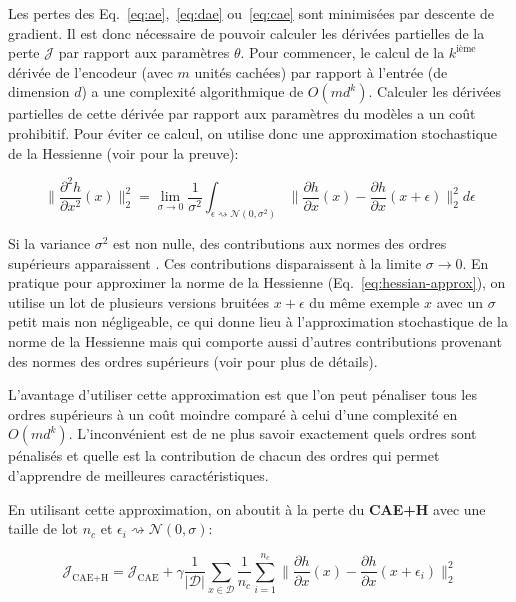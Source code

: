 Les pertes des Eq.~\ref{eq:ae},~\ref{eq:dae} ou~\ref{eq:cae} sont minimisées par
descente de gradient. Il est donc nécessaire de pouvoir calculer les dérivées
partielles de la perte $\mathcal{J}$ par rapport aux paramètres $\theta$. Pour commencer, le calcul de
la $k^{\textrm{ième}}$ dérivée de l'encodeur (avec $m$ unités cachées) par
rapport à l'entrée (de dimension $d$) a une complexité algorithmique de
$O(md^k)$.  Calculer les dérivées partielles de cette dérivée par rapport aux
paramètres du modèles a un coût prohibitif. Pour éviter ce calcul, on utilise donc
une approximation stochastique de la Hessienne (voir \cite{Salah+al-2011} pour
la preuve):

\begin{equation}
\|\dfrac{\partial^2 h}{\partial x^2}(x) \|_2^2 = \lim_{\sigma\rightarrow 0}\frac{1}{\sigma^2}\int_{\epsilon \rightsquigarrow \mathcal{N}(0,\sigma^2)} \| \dfrac{\partial h}{\partial x}(x) - \dfrac{\partial h}{\partial x}(x+\epsilon) \|^2_2 d\epsilon
\label{eq:hessian-approx}
\end{equation}

Si la variance $\sigma^{2}$ est non nulle, des contributions aux normes des ordres
supérieurs apparaissent \citep{Salah+al-2011}. Ces contributions disparaissent à
la limite $\sigma\rightarrow 0$. En pratique pour approximer la norme de la
Hessienne (Eq.~\ref{eq:hessian-approx}), on utilise un lot de plusieurs
versions bruitées $x+\epsilon$ du m\^eme exemple $x$ avec un $\sigma$ petit
mais non négligeable, ce qui donne lieu à l'approximation stochastique de la
norme de la Hessienne mais qui comporte aussi d'autres contributions provenant des
normes des ordres supérieurs (voir \cite{Salah+al-2011} pour plus de détails).

L'avantage d'utiliser cette approximation est que l'on peut pénaliser tous les
ordres supérieurs à un coût moindre comparé à celui d'une complexité en $O(md^k)$.
L'inconvénient est de ne plus savoir exactement quels ordres sont pénalisés et
quelle est la contribution de chacun des ordres qui permet d'apprendre de
meilleures caractéristiques. 

En utilisant cette approximation,  on aboutit à la perte du \textbf{CAE+H} avec
une taille de lot $n_c$ et $\epsilon_i \rightsquigarrow \mathcal{N}(0,\sigma)$:

\begin{equation}
\mathcal{J}_\textrm{CAE+H} = \mathcal{J}_\textrm{CAE} + \gamma\frac{1}{\vert \mathcal{D}\vert}\sum_{x\in\mathcal{D}} \frac{1}{n_c}\sum^{n_c}_{i=1} \| \dfrac{\partial h}{\partial x}(x) - \dfrac{\partial h}{\partial x}(x+\epsilon_i) \|^2_2 
\label{eq:cae}
\end{equation}

